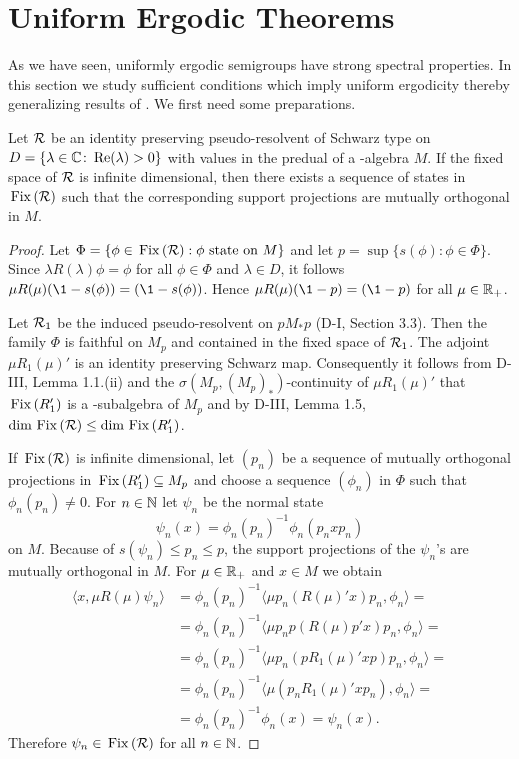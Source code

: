 \section{Uniform Ergodic Theorems}
As we have seen, uniformly ergodic semigroups have strong spectral properties.
In this section we study sufficient conditions which imply uniform ergodicity thereby generalizing results of 
\citet{groh:1984b}.
We first need some preparations.
\begin{lemma}\label{lem:d4-4.1}
Let $ \mathcal{R} $  be an identity preserving pseudo-resolvent of Schwarz type on $ D = \{\lambda \in \mathbb{C} \colon  \mathop{}\!\mathrm{Re}(\lambda) > 0\} $  with values in the predual of a \WA-algebra $ M $.
If the fixed space of $ \mathcal{R} $  is infinite dimensional, then there exists a sequence of states in $ \mathop{}\mathrm{Fix}\left(\mathcal{R}\right) $  such that the corresponding support projections are mutually orthogonal in $ M $.
\end{lemma}
\begin{proof}
Let $ \Phi = \{\phi \in \mathop{}\mathrm{Fix}\left(\mathcal{R}\right): \phi \text{ state on $ M $}\} $  and let $ p = \sup\{s(\phi): \phi \in \Phi\} $.
Since $ \lambda R(\lambda)\phi = \phi $  for all $ \phi \in \Phi $  and $ \lambda \in D $,  it follows $ \mu R(\mu)(\1 - s(\phi)) = (\1 - s(\phi)) $.
Hence $ \mu R(\mu)(\1 - p) = (\1 -p ) $  for all $ \mu \in \mathbb{R}_{+} $.

Let $ \mathcal{R}_{1} $  be the induced pseudo-resolvent on $ pM_{*}p $  (D-I, Section 3.3).
Then the family $ \Phi $  is faithful on $ M_{p} $  and contained in the fixed space of $ \mathcal{R}_{1} $.
The adjoint $ \mu R_{1}(\mu)' $  is an identity preserving Schwarz map.
Consequently it follows from D-III, Lemma 1.1.(ii) and the $ \sigma(M_{p},(M_{p})_{*}) $-continuity of $ \mu R_{1}(\mu)' $  that $ \mathop{}\mathrm{Fix}\left(R_{1}'\right) $  is a \WA-subalgebra of $ M_{p} $  and by D-III, Lemma 1.5, $ \dim \mathop{}\mathrm{Fix}\left(\mathcal{R}\right) \leq \dim \mathop{}\mathrm{Fix}\left(R_{1}'\right) $.

If $ \mathop{}\mathrm{Fix}\left(\mathcal{R}\right) $  is infinite dimensional, let $ (p_{n}) $  be a sequence of mutually orthogonal projections in 
$ \mathop{}\mathrm{Fix}\left( R_{1}' \right) \subseteq M_{p} $  and choose a sequence $ (\phi_{n}) $  in $ \Phi $  such that $ \phi_{n}(p_{n}) \neq 0 $.
For $ n \in \mathbb{N} $  let $ \psi_{n} $  be the normal state
\[
\psi_{n}(x) = \phi_{n}(p_{n})^{-1}\phi_{n}(p_{n}xp_{n})
\]
on $ M $.
Because of $ s(\psi_{n}) \leq p_{n} \leq p $, the support projections of the $ \psi_{n} $'s are mutually orthogonal in $ M $.
For $ \mu \in \mathbb{R}_{+} $  and $ x \in M $  we obtain
\[
\begin{aligned}
\langle x,\mu R(\mu)\psi_{n}\rangle &= \phi_{n}(p_{n})^{-1}\langle\mu p_{n}(R(\mu)'x)p_{n},\phi_{n}\rangle = \\
&= \phi_{n}(p_{n})^{-1}\langle\mu p_{n}p(R(\mu)p'x)p_{n},\phi_{n}\rangle = \\
&= \phi_{n}(p_{n})^{-1}\langle\mu p_{n}(pR_{1}(\mu)'xp)p_{n},\phi_{n}\rangle = \\
&= \phi_{n}(p_{n})^{-1}\langle\mu(p_{n}R_{1}(\mu)'xp_{n}),\phi_{n}\rangle = \\
&= \phi_{n}(p_{n})^{-1}\phi_{n}(x) = \psi_{n}(x).
\end{aligned}
\]
Therefore $ \psi_{n} \in \mathop{}\mathrm{Fix}\left(\mathcal{R}\right) $  for all $ n \in \mathbb{N} $.
\end{proof}
